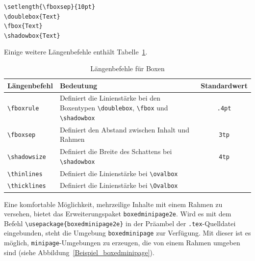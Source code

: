 \documentclass[a4paper,10pt,twoside]{scrbook}
\begin{document}
\begin{minipage}[c]{0.5\textwidth}
\setlength{\parskip}{1em}
\setlength{\fboxsep}{10pt}
\hspace{5mm}
\hspace{5mm}
\hspace{5mm}
\hfill
\end{minipage}
\hfill
\begin{minipage}[c]{0.48\textwidth}
\setlength{\parskip}{2em}
\begin{lstlisting}[label=tabularmultirow8, style=customlatex]
\setlength{\fboxsep}{10pt}
\doublebox{Text} 
\fbox{Text}
\shadowbox{Text}
\end{lstlisting}
\end{minipage}


Einige weitere Längenbefehle enthält Tabelle~\ref{Tabelle_LaengenbefehleBoxen}.



\begin{table}[h!tb]
\centering
\caption{Längenbefehle für Boxen}
\label{Tabelle_LaengenbefehleBoxen}       %
\begin{tabularx}{\textwidth}{lXc}
\hline
Längenbefehl & Bedeutung &  Standardwert \\
\hline
\texttt{\textbackslash fboxrule} & Definiert die Linienstärke bei den Boxentypen \texttt{\textbackslash doublebox}, \texttt{\textbackslash fbox} und \texttt{\textbackslash shadowbox}  & \texttt{.4pt} \\
\texttt{\textbackslash fboxsep} & Definiert den Abstand zwischen Inhalt und Rahmen & \texttt{3tp} \\
\texttt{\textbackslash shadowsize} & Definiert die Breite des Schattens bei \texttt{\textbackslash shadowbox} & \texttt{4tp} \\
\texttt{\textbackslash thinlines} & Definiert die Linienstärke bei \texttt{\textbackslash ovalbox} & \\
\texttt{\textbackslash thicklines} & Definiert die Linienstärke bei \texttt{\textbackslash Ovalbox} &  \\
\hline
\end{tabularx}
\end{table}

Eine komfortable Möglichkeit, mehrzeilige Inhalte mit einem Rahmen zu versehen, bietet das Erweiterungspaket \verb!boxedminipage2e!. Wird es mit dem Befehl \verb!\usepackage{boxedminipage2e}! in der Präambel der \verb!.tex!-Quelldatei eingebunden, steht die 
Umgebung \verb!boxedminipage! zur Verfügung. Mit dieser ist es möglich, 
\verb!minipage!-Umgebungen zu erzeugen, die von einem Rahmen umgeben sind (siehe Abbildung~\ref{Beispiel_boxedminipage}). 
\end{document}

